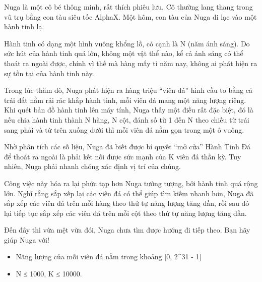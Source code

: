 Nuga là một cô bé thông minh, rất thích phiêu lưu. Cô thường lang thang trong vũ trụ bằng con tàu siêu tốc AlphaX. Một hôm, con tàu của Nuga đi lạc vào một hành tinh lạ.  

   Hành tinh có dạng một hình vuông khổng lồ, có cạnh là N (năm ánh sáng). Do sức hút của hành tinh quá lớn, không một vật thể nào, kể cả ánh sáng có thể thoát ra ngoài được, chính vì thế mà hàng mấy tỉ năm nay, không ai phát hiện ra sự tồn tại của hành tinh này.  

   Trong lúc thăm dò, Nuga phát hiện ra hàng triệu “viên đá” hình cầu to bằng cả trái đất nằm rải rác khắp hành tinh, mỗi viên đá mang một năng lượng riêng. Khi quét bản đồ hành tinh lên máy tính, Nuga thấy một điều rất đặc biệt, đó là nếu chia hành tinh thành N hàng, N cột, đánh số từ 1 đến N theo chiều từ trái sang phải và từ trên xuống dưới thì mỗi viên đá nằm gọn trong một ô vuông.  

   Nhờ phân tích các số liệu, Nuga đã biết được bí quyết “mở cửa” Hành Tinh Đá để thoát ra ngoài là phải kết nối được sức mạnh của K viên đá thần kỳ. Tuy nhiên, Nuga phải nhanh chóng xác định vị trí của chúng.  

   Công việc này hóa ra lại phức tạp hơn Nuga tưởng tượng, bởi hành tinh quá rộng lớn. Nghĩ rằng sắp xếp lại các viên đá có thể giúp tìm kiếm nhanh hơn, Nuga đã sắp xếp các viên đá trên mỗi hàng theo thứ tự năng lượng tăng dần, rồi sau đó lại tiếp tục sắp xếp các viên đá trên mỗi cột theo thứ tự năng lượng tăng dần.  

   Đến đây thì vừa mệt vừa đói, Nuga chưa tìm được hướng đi tiếp theo. Bạn hãy giúp Nuga với!  

\begin{itemize}
	\item     Năng lượng của mỗi viên đá nằm trong khoảng [0, 2^31 - 1]   
	\item     N ≤ 1000, K ≤ 10000.   
\end{itemize}